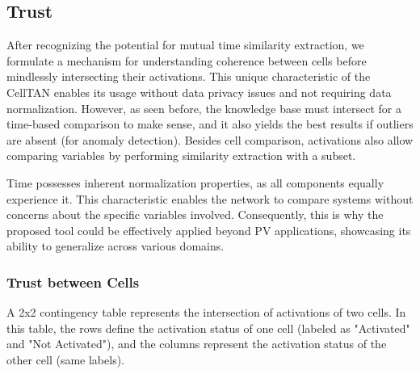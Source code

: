 \subsection{Trust}  \label{subsec:trust}


After recognizing the potential for mutual time similarity extraction, we formulate a mechanism for understanding coherence between cells before mindlessly intersecting their activations. This unique characteristic of the CellTAN enables its usage without data privacy issues and not requiring data normalization. However, as seen before, the knowledge base must intersect for a time-based comparison to make sense, and it also yields the best results if outliers are absent (for anomaly detection). Besides cell comparison, activations also allow comparing variables by performing similarity extraction with a subset.

Time possesses inherent normalization properties, as all components equally experience it. This characteristic enables the network to compare systems without concerns about the specific variables involved. Consequently, this is why the proposed tool could be effectively applied beyond PV applications, showcasing its ability to generalize across various domains.

\subsubsection{Trust between Cells}

A 2x2 contingency table represents the intersection of activations of two cells. In this table, the rows define the activation status of one cell (labeled as "Activated" and "Not Activated"), and the columns represent the activation status of the other cell (same labels).

\begin{table}[h!]
    \centering
    \caption{Contigency table representing the activation intersection of two cells.}
    \label{tab:cellactivationsintersection}
\end{table}

